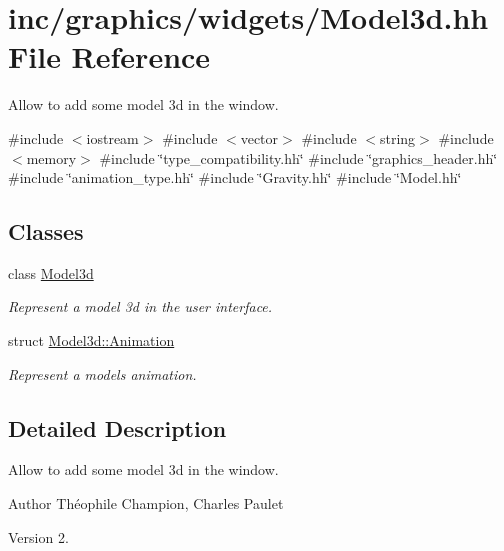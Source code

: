 \hypertarget{Model3d_8hh}{}\section{inc/graphics/widgets/\+Model3d.hh File Reference}
\label{Model3d_8hh}


Allow to add some model 3d in the window.  


{\ttfamily \#include $<$iostream$>$}\newline
{\ttfamily \#include $<$vector$>$}\newline
{\ttfamily \#include $<$string$>$}\newline
{\ttfamily \#include $<$memory$>$}\newline
{\ttfamily \#include \char`\"{}type\+\_\+compatibility.\+hh\char`\"{}}\newline
{\ttfamily \#include \char`\"{}graphics\+\_\+header.\+hh\char`\"{}}\newline
{\ttfamily \#include \char`\"{}animation\+\_\+type.\+hh\char`\"{}}\newline
{\ttfamily \#include \char`\"{}Gravity.\+hh\char`\"{}}\newline
{\ttfamily \#include \char`\"{}Model.\+hh\char`\"{}}\newline
\subsection*{Classes}
\begin{DoxyCompactItemize}
\item 
class \hyperlink{classModel3d}{Model3d}
\begin{DoxyCompactList}\small\item\em Represent a model 3d in the user interface. \end{DoxyCompactList}\item 
struct \hyperlink{structModel3d_1_1Animation}{Model3d\+::\+Animation}
\begin{DoxyCompactList}\small\item\em Represent a model\textquotesingle{}s animation. \end{DoxyCompactList}\end{DoxyCompactItemize}


\subsection{Detailed Description}
Allow to add some model 3d in the window. 

\begin{DoxyAuthor}{Author}
Théophile Champion, Charles Paulet 
\end{DoxyAuthor}
\begin{DoxyVersion}{Version}
2. 
\end{DoxyVersion}
